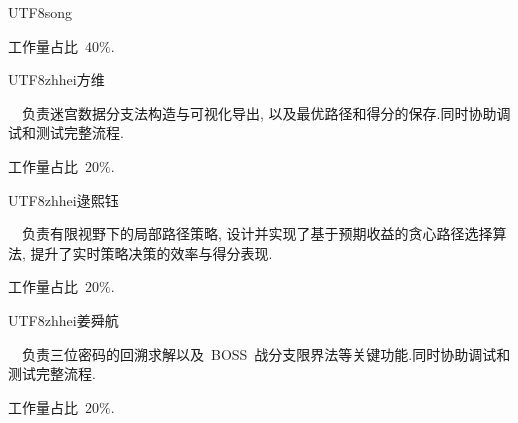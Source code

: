 \documentclass[10.5pt,compsoc]{CjC}
\theoremstyle{mystyle}
\begin{document}
\begin{CJK*}{UTF8}{song}
\begin{biography}
工作量占比~$40\%$.

\end{biography}

\begin{biography}
\noindent
\begin{CJK*}{UTF8}{zhhei}方维\end{CJK*}\ \
负责迷宫数据分支法构造与可视化导出, 以及最优路径和得分的保存.同时协助调试和测试完整流程.

工作量占比~$20\%$.
\end{biography}

\begin{biography}
\noindent
\begin{CJK*}{UTF8}{zhhei}逯熙钰\end{CJK*}\ \
负责有限视野下的局部路径策略, 设计并实现了基于预期收益的贪心路径选择算法,
提升了实时策略决策的效率与得分表现.

工作量占比~$20\%$.
\end{biography}

\begin{biography}
\noindent
\begin{CJK*}{UTF8}{zhhei}姜舜航\end{CJK*}\ \
负责三位密码的回溯求解以及~BOSS~战分支限界法等关键功能.同时协助调试和测试完整流程.

工作量占比~$20\%$.
\end{biography}














\end{CJK*}
\end{document}
